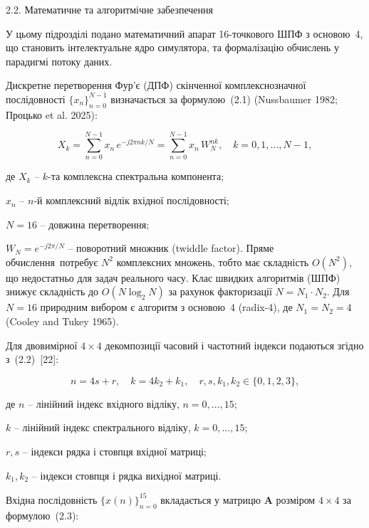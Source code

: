\documentclass[
]{article}
\begin{document}
\protect{}\label{_Toc228121450}{}2.2. Математичне та
алгоритмічне забезпечення

У цьому підрозділі подано математичний апарат 16-точкового ШПФ з
основою~4, що становить інтелектуальне ядро симулятора, та формалізацію
обчислень у парадигмі потоку даних.

Дискретне перетворення Фур'є (ДПФ) скінченної комплекснозначної
послідовності \(\{ x_{n}\}_{n = 0}^{N - 1}\) визначається за формулою~(2.1)
(Nussbaumer 1982; Процько et al. 2025):

\begin{equation}
\tag{2.1}\label{eq:dft-twiddle}
X_{k} = \sum_{n = 0}^{N - 1}x_{n}\, e^{- j2\pi nk/N} = \sum_{n = 0}^{N - 1}x_{n}\, W_{N}^{nk},\quad k = 0,1,\ldots,N - 1,
\end{equation}

де \(X_{k}\) -- \(k\)-та комплексна спектральна компонента;

\(x_{n}\) -- \(n\)-й комплексний відлік вхідної послідовності;

\(N = 16\) -- довжина перетворення;

\(W_{N} = e^{- j2\pi/N}\) -- поворотний множник (twiddle factor).
Пряме обчислення~потребує \(N^{2}\) комплексних множень, тобто має
складність \(O(N^{2})\), що недостатньо для задач реального часу. Клас
швидких алгоритмів (ШПФ) знижує складність до \(O(N\log_{2}N)\) за
рахунок факторизації \(N = N_{1} \cdot N_{2}\). Для \(N = 16\) природним
вибором є алгоритм з основою~4 (radix-4), де \(N_{1} = N_{2} = 4\)
(Cooley and Tukey 1965).

Для двовимірної \(4 \times 4\) декомпозиції часовий і частотний індекси
подаються згідно з~(2.2)~{[}22{]}:

\begin{equation}
\tag{2.2}\label{eq:index-decomposition}
n = 4s + r,\quad k = 4k_{2} + k_{1},\quad r,s,k_{1},k_{2} \in \{ 0,1,2,3\},
\end{equation}

де \(n\) -- лінійний індекс вхідного відліку, \(n = 0,\ldots,15\);

\(k\) -- лінійний індекс спектрального відліку, \(k = 0,\ldots,15\);

\(r,s\) -- індекси рядка і стовпця вхідної матриці;

\(k_{1},k_{2}\) -- індекси стовпця і рядка вихідної матриці.

Вхідна послідовність \(\{ x(n)\}_{n = 0}^{15}\) вкладається у матрицю
\(\mathbf{A}\) розміром \(4 \times 4\) за формулою~(2.3):
\end{document}
